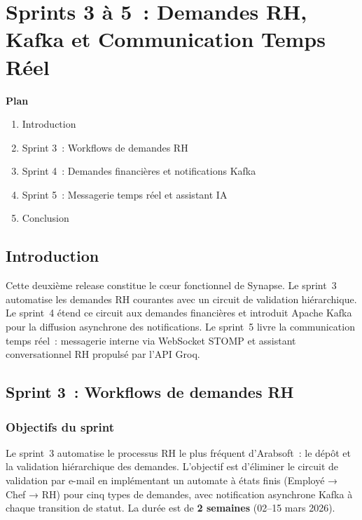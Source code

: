 ﻿%
\chapter{Sprints 3 à 5~: Demandes RH, Kafka et Communication Temps Réel}

\noindent\textbf{Plan}
\begin{enumerate}
  \item Introduction
  \item Sprint 3~: Workflows de demandes RH
  \item Sprint 4~: Demandes financières et notifications Kafka
  \item Sprint 5~: Messagerie temps réel et assistant IA
  \item Conclusion
\end{enumerate}

\section{Introduction}

Cette deuxième release constitue le cœur fonctionnel de Synapse. Le sprint~3
automatise les demandes RH courantes avec un circuit de validation hiérarchique.
Le sprint~4 étend ce circuit aux demandes financières et introduit Apache Kafka
pour la diffusion asynchrone des notifications. Le sprint~5 livre la communication
temps réel~: messagerie interne via WebSocket STOMP et assistant conversationnel RH
propulsé par l'API Groq.

\section{Sprint 3~: Workflows de demandes RH}

\subsection{Objectifs du sprint}

Le sprint~3 automatise le processus RH le plus fréquent d'Arabsoft~: le dépôt et
la validation hiérarchique des demandes. L'objectif est d'éliminer le circuit de
validation par e-mail en implémentant un automate à états finis (Employé →
Chef → RH) pour cinq types de demandes, avec notification asynchrone Kafka à
chaque transition de statut. La durée est de \textbf{2 semaines}
(02--15 mars 2026).

